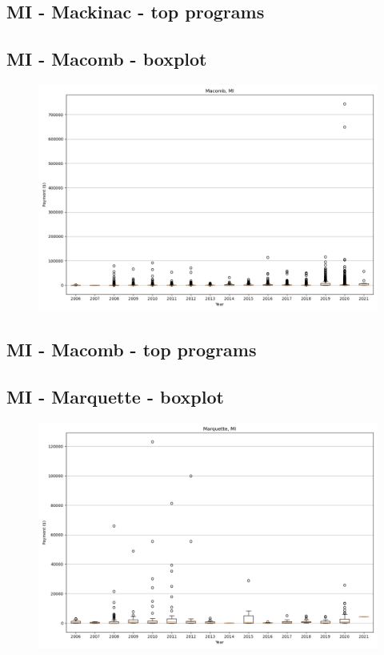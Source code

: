 \subsection*{MI - Mackinac - top programs}

\newpage
\subsection*{MI - Macomb - boxplot}
\begin{figure}[h]
\centering
\includegraphics[width=7in]{../output/boxplots/counties/Macomb-MI_boxplot.png}
\end{figure}


\subsection*{MI - Macomb - top programs}

\newpage
\subsection*{MI - Marquette - boxplot}
\begin{figure}[h]
\centering
\includegraphics[width=7in]{../output/boxplots/counties/Marquette-MI_boxplot.png}
\end{figure}


